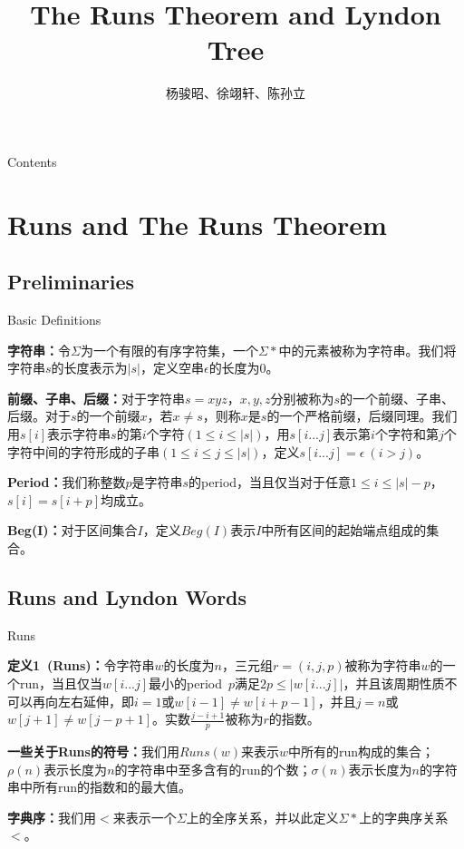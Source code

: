 \documentclass{beamer}
\title{The Runs Theorem and Lyndon Tree}
\author{杨骏昭、徐翊轩、陈孙立}
\institute{NFLS、SCZ}
\begin{document}
\begin{frame}
    \titlepage
\end{frame}

\begin{frame}{Contents}
	\tableofcontents
\end{frame}

\section{Runs and The Runs Theorem}

\subsection{Preliminaries}

\begin{frame}{Basic Definitions}
    \par \textbf{字符串：}令$\Sigma$为一个有限的有序字符集，一个$\Sigma*$中的元素被称为字符串。我们将字符串$s$的长度表示为$|s|$，定义空串$\epsilon$的长度为0。
    \pause
    \par \textbf{前缀、子串、后缀：}对于字符串$s=xyz$，$x,y,z$分别被称为$s$的一个前缀、子串、后缀。对于$s$的一个前缀$x$，若$x\ne s$，则称$x$是$s$的一个严格前缀，后缀同理。我们用$s[i]$表示字符串$s$的第$i$个字符$(1\leq i\leq |s|)$，用$s[i...j]$表示第$i$个字符和第$j$个字符中间的字符形成的子串$(1\leq i\leq j\leq |s|)$，定义$s[i...j]=\epsilon\ (i>j)$。
	\pause
	\par \textbf{Period：}我们称整数$p$是字符串$s$的period，当且仅当对于任意$1\leq i\leq|s|-p$，$s[i]=s[i+p]$均成立。
	\pause
    \par \textbf{Beg(I)：}对于区间集合$I$，定义$Beg(I)$表示$I$中所有区间的起始端点组成的集合。
\end{frame}

\subsection{Runs and Lyndon Words}

\begin{frame}{Runs}
    \par \textbf{定义1\ (Runs)：}令字符串$w$的长度为$n$，三元组$r=(i,j,p)$被称为字符串$w$的一个run，当且仅当$w[i...j]$最小的period\ $p$满足$2p\leq |w[i...j]|$，并且该周期性质不可以再向左右延伸，即$i=1$或$w[i-1]\ne w[i+p-1]$，并且$j=n$或$w[j+1]\ne w[j-p+1]$。实数$\frac{j-i+1}{p}$被称为$r$的指数。
    \pause
    \par \textbf{一些关于Runs的符号：}我们用$Runs(w)$来表示$w$中所有的run构成的集合；$\rho(n)$表示长度为$n$的字符串中至多含有的run的个数；$\sigma(n)$表示长度为$n$的字符串中所有run的指数和的最大值。
	\pause
    \par \textbf{字典序：}我们用$<$来表示一个$\Sigma$上的全序关系，并以此定义$\Sigma*$上的字典序关系$<$。
\end{frame}
\end{document}
